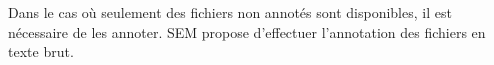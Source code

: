 \documentclass[manual-fr.tex]{subfiles}
\begin{document}
Dans le cas où seulement des fichiers non annotés sont disponibles, il est nécessaire de les annoter. SEM propose d'effectuer l'annotation des fichiers en texte brut.
\end{document}
